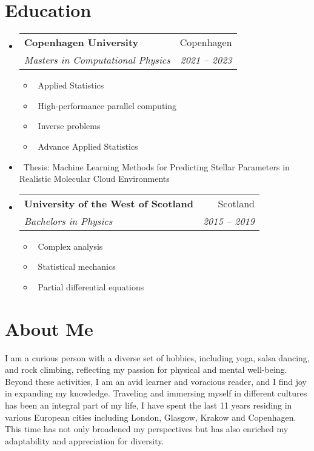 \documentclass[letterpaper,10pt]{article}
\makeatletter
\newcommand{\resumeItem}[1]{\item\small{#1}}
\newcommand{\resumeSubheading}[4]{
\vspace{-1pt}\item
  \begin{tabular*}{0.97\textwidth}[t]{l@{\extracolsep{\fill}}r}
    \textbf{#1} & #2 \\
    \textit{#3} & \textit{#4} \\
  \end{tabular*}\vspace{-7pt}
}
\newcommand{\resumeSubHeadingList}{\begin{itemize}[leftmargin=0.15in, label={}]}
\newcommand{\resumeSubHeadingListEnd}{\end{itemize}}
\makeatother
\begin{document}
\section{Education}
\resumeSubHeadingList
  \resumeSubheading
      {Copenhagen University}{Copenhagen}
      {Masters in Computational Physics}{2021 -- 2023}
      \resumeSubHeadingList
          \resumeItem{\textbullet\ Applied Statistics}
          \resumeItem{\textbullet\ High-performance parallel computing}
          \resumeItem{\textbullet\ Inverse problems}
          \resumeItem{\textbullet\ Advance Applied Statistics}
      \resumeSubHeadingListEnd
      \resumeItem{\textbullet\ Thesis: Machine Learning Methods for Predicting Stellar Parameters in Realistic Molecular Cloud Environments}
  \resumeSubheading
      {University of the West of Scotland}{Scotland}
      {Bachelors in Physics}{2015 -- 2019}
      \resumeSubHeadingList
          \resumeItem{\textbullet\ Complex analysis}
          \resumeItem{\textbullet\ Statistical mechanics}
          \resumeItem{\textbullet\ Partial differential equations}
      \resumeSubHeadingListEnd
\resumeSubHeadingListEnd

\section{About Me}
I am a curious person with a diverse set of hobbies, including yoga, salsa dancing, and rock climbing, reflecting my passion for physical and mental well-being. Beyond these activities, I am an avid learner and voracious reader, and I find joy in expanding my knowledge. Traveling and immersing myself in different cultures has been an integral part of my life, I have spent the last 11 years residing in various European cities including London, Glasgow, Krakow and Copenhagen. This time has not only broadened my perspectives but has also enriched my adaptability and appreciation for diversity.
\end{document}
